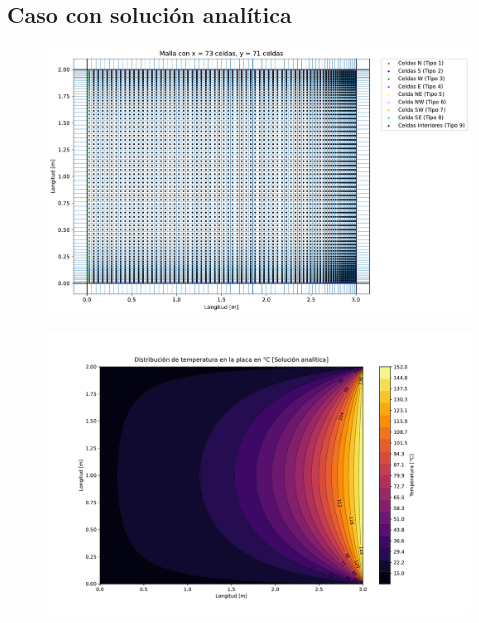 \documentclass[article,latterpaper]{IEEEtran}
\begin{document}
\subsection{Caso con solución analítica}

\begin{figure}[H]
    \centering
    \includegraphics[scale=0.25]{Caso_analitico/Malla.pdf}
    \caption{ }
    \label{Malla_An_num}
\end{figure}

\begin{figure}[H]
    \centering
    \includegraphics[scale=0.25]{Caso_analitico/Dist_T_An.pdf}
    \caption{ }
    \label{T_Sol_An}
\end{figure}
\end{document}
